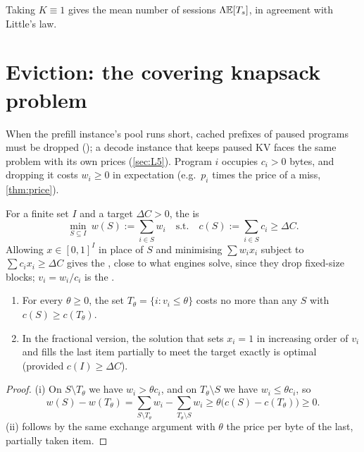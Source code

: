Taking $K\equiv1$ gives the mean number of sessions $\Lambda\mathbb{E}[T_s]$, in agreement
with Little's law.

\section{Eviction: the covering knapsack problem}\label{L4:sec:knapsack}

When the prefill instance's pool runs short, cached prefixes of paused programs must be
dropped (); a decode instance that keeps paused KV faces the same problem
with its own prices (\cref{sec:L5}). Program $i$ occupies $c_i>0$ bytes, and dropping it
costs $w_i\ge0$ in expectation (e.g.\ $p_i$ times the price of a miss, \cref{thm:price}).

\begin{definition}\label{L4:def:knapsack}
For a finite set $I$ and a target $\Delta C>0$, the  is
\[
  \min_{S\subseteq I}\ w(S):=\sum_{i\in S}w_i\quad\text{s.t.}\quad c(S):=\sum_{i\in S}c_i\ge\Delta C .
\]
Allowing $x\in[0,1]^I$ in place of $S$ and minimising $\sum w_ix_i$ subject to
$\sum c_ix_i\ge\Delta C$ gives the , close to what engines
solve, since they drop fixed-size blocks; $v_i=w_i/c_i$ is the .
\end{definition}

\begin{theorem}\label{thm:threshold}
\begin{enumerate}[label=(\roman*)]
\item For every $\theta\ge0$, the set $T_\theta=\{i:v_i\le\theta\}$ costs no more
  than any $S$ with $c(S)\ge c(T_\theta)$.
\item In the fractional version, the solution that sets $x_i=1$ in increasing
  order of $v_i$ and fills the last item partially to meet the target exactly is
  optimal (provided $c(I)\ge\Delta C$).
\end{enumerate}
\end{theorem}

\begin{proof}
(i) On $S\setminus T_\theta$ we have $w_i>\theta c_i$, and on $T_\theta\setminus S$
we have $w_i\le\theta c_i$, so
\[
  w(S)-w(T_\theta)=\sum_{S\setminus T_\theta}w_i-\sum_{T_\theta\setminus S}w_i
  \ge\theta\bigl(c(S)-c(T_\theta)\bigr)\ge0 .
\]
(ii) follows by the same exchange argument with $\theta$ the price per byte of the
last, partially taken item.
\end{proof}


